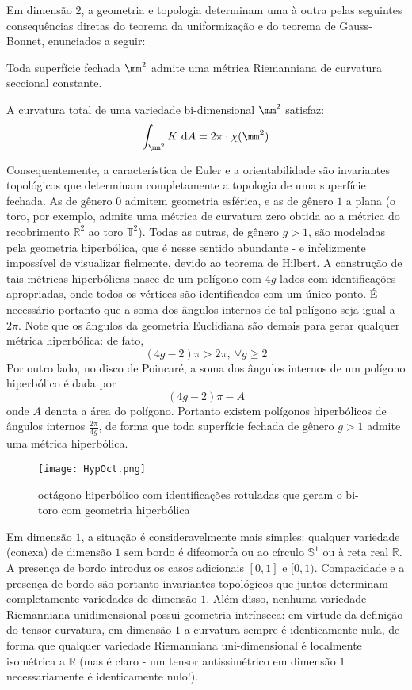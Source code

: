 Em dimensão $2$, a geometria e topologia determinam uma à outra pelas seguintes consequências diretas do teorema da uniformização e do teorema de Gauss-Bonnet, enunciados a seguir:
\begin{teorema}
Toda superfície fechada $\mm^2$ admite uma métrica Riemanniana de curvatura seccional constante.
\end{teorema}
\begin{teorema} A curvatura total de uma variedade bi-dimensional $\mm^2$ satisfaz:
\[
\int_{\mm^2} K \ \mathrm{d} A = 2 \pi \cdot \chi(\mm^2)
\]
\end{teorema}
Consequentemente, a característica de Euler e a orientabilidade são invariantes topológicos que determinam completamente a topologia de uma superfície fechada. As de gênero $0$ admitem geometria esférica, e as de gênero $1$ a plana (o toro, por exemplo, admite uma métrica de curvatura zero obtida ao  a métrica do recobrimento $\mathbb{R}^2$ ao toro $\mathbb{T}^2$). Todas as outras, de gênero $g >1$, são modeladas pela geometria hiperbólica, que é nesse sentido abundante - e infelizmente impossível de visualizar fielmente, devido ao teorema de Hilbert. A construção de tais métricas hiperbólicas nasce de um polígono com $4g$ lados com identificações apropriadas, onde todos os vértices são identificados com um único ponto. É necessário portanto que a soma dos ângulos internos de tal polígono seja igual a $2 \pi$. Note que os ângulos da geometria Euclidiana são  demais para gerar qualquer métrica hiperbólica: de fato, 
\[
(4g - 2) \pi > 2 \pi, \ \forall g \geq 2
\] Por outro lado, no disco de Poincaré, a soma dos ângulos internos de um polígono hiperbólico é dada por
$$(4g - 2) \pi - A$$
onde $A$ denota a área do polígono. Portanto existem polígonos hiperbólicos de ângulos internos $\frac{2 \pi}{4g}$, de forma que toda superfície fechada de gênero $g > 1$ admite uma métrica hiperbólica.
\begin{figure}[H]
\centering
\texttt{[image: HypOct.png]}
\caption{octágono hiperbólico com identificações rotuladas que geram o bi-toro com geometria hiperbólica}
\end{figure}
\par 
Em dimensão $1$, a situação é consideravelmente mais simples: qualquer variedade (conexa) de dimensão $1$ sem bordo é difeomorfa ou ao círculo $\mathbb{S}^1$ ou à reta real $\mathbb{R}$. A presença de bordo introduz os casos adicionais $[0, 1]$ e $[0, 1)$. Compacidade e a presença de bordo são portanto invariantes topológicos que juntos determinam completamente variedades de dimensão $1$. Além disso, nenhuma variedade Riemanniana unidimensional possui geometria intrínseca: em virtude da definição do tensor curvatura, em dimensão $1$ a curvatura sempre é identicamente nula, de forma que qualquer variedade Riemanniana uni-dimensional é localmente isométrica a $\mathbb{R}$ (mas é claro - um tensor antissimétrico em dimensão $1$ necessariamente é identicamente nulo!).
